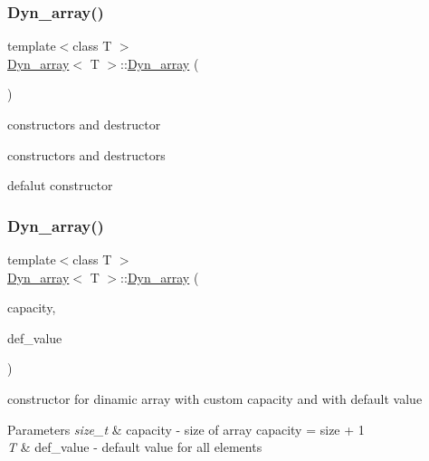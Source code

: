 \subsubsection{\texorpdfstring{Dyn\+\_\+array()}{Dyn\_array()}\hspace{0.1cm}{\footnotesize\ttfamily [1/6]}}
{\footnotesize\ttfamily template$<$class T $>$ \\
\hyperlink{classDyn__array}{Dyn\+\_\+array}$<$ T $>$\+::\hyperlink{classDyn__array}{Dyn\+\_\+array} (\begin{DoxyParamCaption}{ }\end{DoxyParamCaption})}



constructors and destructor 

constructors and destructors

defalut constructor \mbox{\label{classDyn__array_a25117136ea5c69b0bee57d5c12b481b9}} 
\subsubsection{\texorpdfstring{Dyn\+\_\+array()}{Dyn\_array()}\hspace{0.1cm}{\footnotesize\ttfamily [2/6]}}
{\footnotesize\ttfamily template$<$class T $>$ \\
\hyperlink{classDyn__array}{Dyn\+\_\+array}$<$ T $>$\+::\hyperlink{classDyn__array}{Dyn\+\_\+array} (\begin{DoxyParamCaption}\item[{const size\+\_\+t}]{capacity,  }\item[{const T}]{def\+\_\+value }\end{DoxyParamCaption})}



constructor for dinamic array with custom capacity and with default value 


\begin{DoxyParams}{Parameters}
{\em size\+\_\+t} & capacity -\/ size of array capacity = size + 1 \\
\hline
{\em T} & def\+\_\+value -\/ default value for all elements \\
\hline
\end{DoxyParams}
\mbox{\label{classDyn__array_ab65231e8b87c5fbb58f22fb8a1d18ee3}} 
